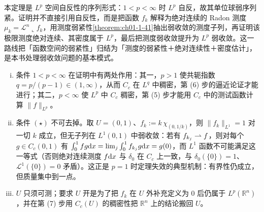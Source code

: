 \documentclass[../../main.tex]{subfiles}%
\begin{document}
\begin{remark}\label{remark:ch01-thm-1-42-动机}
本定理是 $L^p$ 空间自反性的序列形式：$1<p<\infty$ 时 $L^p$ 自反，故其单位球弱序列紧。证明并不直接引用自反性，而是把函数 $f_k$ 解释为绝对连续的 Radon 测度 $\mu_k=\mathcal{L}^n\llcorner f_k$，用测度弱紧性\cref{theorem:ch01-1-41}抽出弱收敛的测度子列，再证明该极限测度绝对连续、其密度属于 $L^p$，最后把测度弱收敛提升为 $L^p$ 弱收敛。这一路线把「函数空间的弱紧性」归结为「测度的弱紧性＋绝对连续性＋密度估计」，是本书处理弱收敛问题的基本模式。%
\end{remark}

\begin{remark}\label{remark:ch01-thm-1-42-条件}
\begin{enumerate}[(i)]
\item 条件 $1<p<\infty$ 在证明中有两处作用：其一，$p>1$ 使共轭指数 $q=p/(p-1)\in(1,\infty)$，从而 $C_c$ 在 $L^q$ 中稠密，第 (6) 步的逼近论证才能进行；其二，$p<\infty$ 使 $L^p$ 中 $C_c$ 稠密，第 (5) 步才能用 $C_c$ 中的测试函数计算 $\lVert f\rVert_{L^p}$。
\item 条件 $(\star)$ 不可去掉。取 $U=(0,1)$、$f_k:=k\,\chi_{(0,1/k)}$，则 $\lVert f_k\rVert_{L^1}=1$ 对一切 $k$ 成立，但无子列在 $L^1(0,1)$ 中弱收敛：若有 $f_{k_j}\rightharpoonup f$，则对每个 $g\in C_c(0,1)$ 有 $\int_0^1f g\mathrm{d} x=\lim_j\int_0^1f_{k_j}g\mathrm{d} x=g(0)$，而 $L^1$ 函数不可能满足这一等式（否则绝对连续测度 $f\mathrm{d} x$ 与 $\delta_0$ 在 $C_c$ 上一致，与 $\delta_0(\{0\})=1$、$\mathcal{L}^1(\{0\})=0$ 矛盾）。这正是 $p=1$ 时定理失效的典型机制：有界性仍成立，但质量集中到一点。
\item $U$ 只须可测；要求 $U$ 开是为了把 $f_k$ 在 $U$ 外补充定义为 $0$ 后仍属于 $L^p(\mathbb{R}^n)$，并在第 (7) 步用 $C_c(U)$ 的稠密性把 $\mathbb{R}^n$ 上的结论搬回 $U$。
\end{enumerate}
\end{remark}
\end{document}
